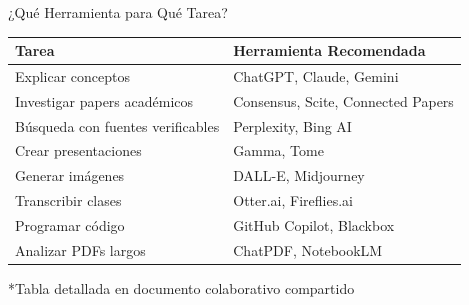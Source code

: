 \documentclass[aspectratio=169,xcolor={dvipsnames}]{beamer}
\begin{document}
	\begin{frame}{¿Qué Herramienta para Qué Tarea?}
		
		\begin{table}
			\centering
			\footnotesize
			\begin{tabular}{p{4cm}p{7cm}}
				\toprule
				\textbf{Tarea} & \textbf{Herramienta Recomendada} \\
				\midrule
				Explicar conceptos & ChatGPT, Claude, Gemini \\
				\addlinespace
				Investigar papers académicos & Consensus, Scite, Connected Papers \\
				\addlinespace
				Búsqueda con fuentes verificables & Perplexity, Bing AI \\
				\addlinespace
				Crear presentaciones & Gamma, Tome \\
				\addlinespace
				Generar imágenes & DALL-E, Midjourney \\
				\addlinespace
				Transcribir clases & Otter.ai, Fireflies.ai \\
				\addlinespace
				Programar código & GitHub Copilot, Blackbox \\
				\addlinespace
				Analizar PDFs largos & ChatPDF, NotebookLM \\
				\bottomrule
			\end{tabular}
		\end{table}
		
		\vspace{0.3cm}
		\centering
		\footnotesize
		*Tabla detallada en documento colaborativo compartido
		
	\end{frame}
	
\end{document}
